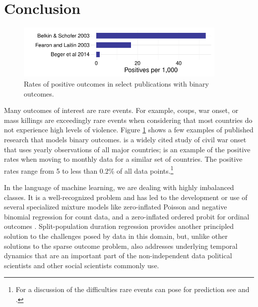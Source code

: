 
\section{Conclusion}

\begin{figure}[htbp!]
\centering
\includegraphics[width = 4in]{graphics/rates.pdf}
\caption{Rates of positive outcomes in select publications with binary outcomes.}
\label{rates}
\end{figure}

Many outcomes of interest are rare events. For example, coups, war
onset, or mass killings are exceedingly rare events when considering
that most countries do not experience high levels of violence. Figure
\ref{rates} shows a few examples of published research that models
binary outcomes. \citet{fearon2003ethnicity} is a widely cited study of
civil war onset that uses yearly observations of all major countries;
\citet{beger2014ensemble} is an example of the positive rates when
moving to monthly data for a similar set of countries. The positive
rates range from 5 to less than 0.2\% of all data points.\footnote{For a
  discussion of the difficulties rare events can pose for prediction see
  \citet{king2001explaining} and \citet{king2001logistic}.}

In the language of machine learning, we are dealing with highly
imbalanced classes. It is a well-recognized problem and has led to the
development or use of several specialized mixture models like
zero-inflated Poisson and negative binomial regression for count data,
and a zero-inflated ordered probit for ordinal outcomes \citep{bagozzi2015modeling}. Split-population duration regression provides another principled
solution to the challenges posed by data in this domain, but, unlike
other solutions to the sparse outcome problem, also addresses underlying
temporal dynamics that are an important part of the non-independent data
political scientists and other social scientists commonly use.

